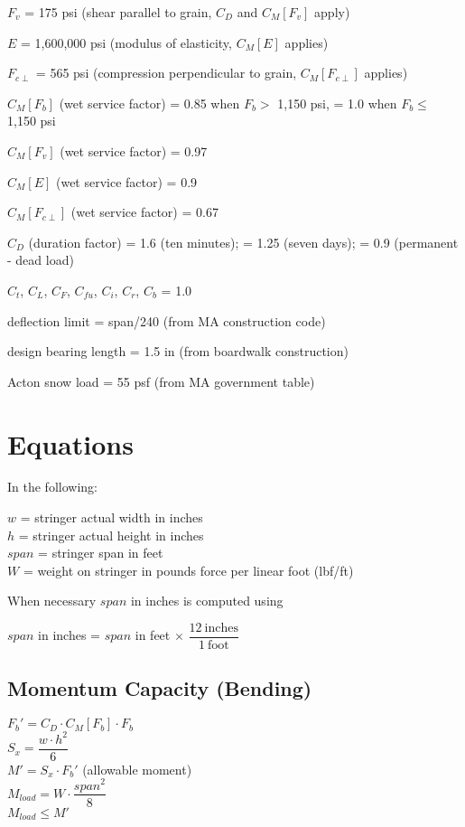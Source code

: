 \documentclass[12pt]{article}
\newenvironment{indpar}[1][0.3in]%
	{\begin{list}{}%
		     {\setlength{\itemsep}{0in}%
		      \setlength{\topsep}{0in}%
		      \setlength{\parsep}{1ex}%
		      \setlength{\labelwidth}{#1}%
		      \setlength{\leftmargin}{#1}%
		      \addtolength{\leftmargin}{\labelsep}}%
	 \item}%
	{\end{list}}
\begin{document}
$F_v$ = 175 psi (shear parallel to grain, $C_D$ and $C_M[F_v]$ apply)

$E$ = 1,600,000 psi (modulus of elasticity, $C_M[E]$ applies)

$F_{c\perp}$ = 565 psi (compression perpendicular to grain,
    $C_M[F_{c\perp}]$ applies)

$C_M[F_b]$ (wet service factor)
    = 0.85 when $F_b >$ 1,150 psi, = 1.0 when $F_b \leq$ 1,150 psi

$C_M[F_v]$ (wet service factor) = 0.97

$C_M[E]$ (wet service factor) = 0.9

$C_M[F_{c\perp}]$ (wet service factor) = 0.67

$C_D$ (duration factor) = 1.6 (ten minutes); = 1.25 (seven days);
                        = 0.9 (permanent - dead load)

$C_t$, $C_L$, $C_F$, $C_{fu}$, $C_i$, $C_r$, $C_b$ = 1.0

deflection limit = span/240 (from MA construction code)

design bearing length = 1.5 in  (from boardwalk construction)

Acton snow load = 55 psf  (from MA government table)

\newpage
\section{Equations}

In the following:

\begin{indpar}
$w$ = stringer actual width in inches \\
$h$ = stringer actual height in inches \\
$span$ = stringer span in feet \\
$W$ = weight on stringer in pounds force per linear foot (lbf/ft)
\end{indpar}
When necessary $span$ in inches is computed using
\begin{indpar}
$span$ in inches  = $span$ in feet $\times$
                    $\dfrac{12~\mathrm{inches}}{1~\mathrm{foot}}$
\end{indpar}

\subsection{Momentum Capacity (Bending)}

$F_b' = C_D \cdot C_M[F_b] \cdot F_b$
\\[1.0ex]
$S_x = \dfrac{w\cdot h^2}{6}$
\\[1.0ex]
$M' = S_x \cdot F_b'$ (allowable moment)
\\[1.0ex]
$M_{load} = W \cdot \dfrac{span^2}{8}$
\\[1.0ex]
$M_{load} \leq M'$
\end{document}
